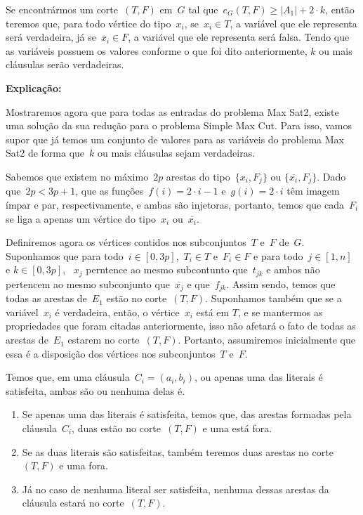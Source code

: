 \documentclass[a4paper,12pt]{article}
\begin{document}
		\bigskip
		\bigskip

		Se encontrármos um corte~$(T,F)$ em~$G$ tal 
		que~$e_G(T, F)\ge |A_1| + 2\cdot k$, 
		então teremos que, para todo vértice do tipo~$x_i$,
		se~$x_i\in T$, a variável que ele representa será
		verdadeira, já se~$x_i\in F$, a variável que ele representa
		será falsa. Tendo que as variáveis possuem os valores conforme
		o que foi dito anteriormente, $k$ ou mais cláusulas serão 
		verdadeiras.

		\bigskip
		\bigskip
		\bigskip
		\bigskip
		\bigskip

		\textbf{Explicação:}

		\bigskip

		Mostraremos agora que para todas as entradas do problema
		Max Sat2, existe uma solução da sua redução para o problema
		Simple Max Cut.
		Para isso, vamos supor que já temos um conjunto de valores
		para as variáveis do problema Max Sat2 de forma que~$k$ ou mais
		cláusulas sejam verdadeiras.

		Sabemos que existem no máximo~$2p$ arestas do 
		tipo~$\{x_i,F_j\}$ ou $\{\overline{x_i},F_j\}$. Dado 
		que~$2p<3p+1$,
		que as funções~$f(i)=2\cdot i - 1$ e~$g(i)=2\cdot i$ têm imagem 
		ímpar e par, respectivamente, e ambas são injetoras, portanto, 
		temos que cada~$F_i$ se liga a apenas um vértice
		do tipo~$x_i$ ou~$\overline{x_i}$.

		Definiremos agora os vértices contidos nos 
		subconjuntos~$T$ e~$F$ de~$G$.
		Suponhamos que para todo~$i\in[0,3p]$,~$T_i\in T$ e~$F_i\in F$ e
		para todo~$j\in[1,n]$ e $k\in[0,3p]$, ~$x_j$ perntence ao 
		mesmo subcontunto que~$t_{jk}$ e ambos
		 não pertencem ao mesmo 
		subconjunto que~$\overline{x_j}$ e que~$f_{jk}$.
		Assim sendo, temos que todas as arestas de~$E_1$ estão no 
		corte~$(T,F)$.
		Suponhamos também que se a variável~$x_i$ é verdadeira,
		então, o vértice~$x_i$ está em $T$, e se mantermos as 
		propriedades que foram citadas anteriormente, isso não afetará o 
		fato de todas as arestas de~$E_1$ estarem no corte~$(T,F)$.
		Portanto, assumiremos inicialmente que essa é a disposição dos 
		vértices nos subconjuntos~$T$ e~$F$.

		Temos que, em uma cláusula~$C_i=(a_i,b_i)$, ou
		apenas uma das literais é satisfeita, ambas são ou nenhuma
		delas é.
		\begin{enumerate}
			\item Se apenas uma das literais é satisfeita, temos que,
			das arestas formadas pela cláusula~$C_i$, duas
			estão no corte~$(T,F)$ e uma está fora.
			\item Se as duas literais são satisfeitas, também teremos
			duas arestas no corte~$(T,F)$ e uma fora.
			\item Já no caso de nenhuma literal ser satisfeita, nenhuma
			dessas arestas da cláusula estará no corte~$(T,F)$.
		\end{enumerate}
\end{document}
